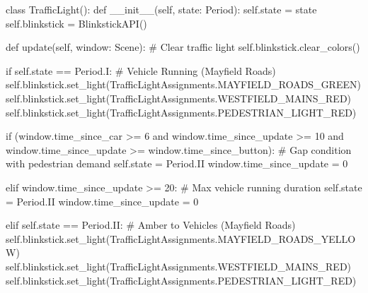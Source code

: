 \documentclass[
  letterpaper,
  DIV=11,
  numbers=noendperiod]{scrartcl}
\newenvironment{Shaded}{\begin{snugshade}}{\end{snugshade}}
\newcommand{\CommentTok}[1]{\textcolor[rgb]{0.37,0.37,0.37}{#1}}
\newcommand{\ControlFlowTok}[1]{\textcolor[rgb]{0.00,0.23,0.31}{#1}}
\newcommand{\DecValTok}[1]{\textcolor[rgb]{0.68,0.00,0.00}{#1}}
\newcommand{\FunctionTok}[1]{\textcolor[rgb]{0.28,0.35,0.67}{#1}}
\newcommand{\KeywordTok}[1]{\textcolor[rgb]{0.00,0.23,0.31}{#1}}
\newcommand{\NormalTok}[1]{\textcolor[rgb]{0.00,0.23,0.31}{#1}}
\newcommand{\OperatorTok}[1]{\textcolor[rgb]{0.37,0.37,0.37}{#1}}
\newcommand{\VariableTok}[1]{\textcolor[rgb]{0.07,0.07,0.07}{#1}}
\begin{document}
\begin{Shaded}
\begin{Highlighting}[]
\KeywordTok{class}\NormalTok{ TrafficLight():}
    \KeywordTok{def} \FunctionTok{\_\_init\_\_}\NormalTok{(}\VariableTok{self}\NormalTok{, state: Period):}
        \VariableTok{self}\NormalTok{.state }\OperatorTok{=}\NormalTok{ state}
        \VariableTok{self}\NormalTok{.blinkstick }\OperatorTok{=}\NormalTok{ BlinkstickAPI()}

    \KeywordTok{def}\NormalTok{ update(}\VariableTok{self}\NormalTok{, window: Scene):}
        \CommentTok{\# Clear traffic light}
        \VariableTok{self}\NormalTok{.blinkstick.clear\_colors()}

        \ControlFlowTok{if} \VariableTok{self}\NormalTok{.state }\OperatorTok{==}\NormalTok{ Period.I:}
            \CommentTok{\# Vehicle Running (Mayfield Roads)}
            \VariableTok{self}\NormalTok{.blinkstick.set\_light(TrafficLightAssignments.MAYFIELD\_ROADS\_GREEN)}
            \VariableTok{self}\NormalTok{.blinkstick.set\_light(TrafficLightAssignments.WESTFIELD\_MAINS\_RED)}
            \VariableTok{self}\NormalTok{.blinkstick.set\_light(TrafficLightAssignments.PEDESTRIAN\_LIGHT\_RED)}
            
            \ControlFlowTok{if}\NormalTok{ (window.time\_since\_car }\OperatorTok{\textgreater{}=} \DecValTok{6} \KeywordTok{and} 
\NormalTok{                window.time\_since\_update }\OperatorTok{\textgreater{}=} \DecValTok{10} \KeywordTok{and} 
\NormalTok{                window.time\_since\_update }\OperatorTok{\textgreater{}=}\NormalTok{ window.time\_since\_button):}
                \CommentTok{\# Gap condition with pedestrian demand}
                \VariableTok{self}\NormalTok{.state }\OperatorTok{=}\NormalTok{ Period.II}
\NormalTok{                window.time\_since\_update }\OperatorTok{=} \DecValTok{0}

            \ControlFlowTok{elif}\NormalTok{ window.time\_since\_update }\OperatorTok{\textgreater{}=} \DecValTok{20}\NormalTok{:}
                \CommentTok{\# Max vehicle running duration}
                \VariableTok{self}\NormalTok{.state }\OperatorTok{=}\NormalTok{ Period.II}
\NormalTok{                window.time\_since\_update }\OperatorTok{=} \DecValTok{0}
        
        \ControlFlowTok{elif} \VariableTok{self}\NormalTok{.state }\OperatorTok{==}\NormalTok{ Period.II:}
            \CommentTok{\# Amber to Vehicles (Mayfield Roads)}
            \VariableTok{self}\NormalTok{.blinkstick.set\_light(TrafficLightAssignments.MAYFIELD\_ROADS\_YELLOW)}
            \VariableTok{self}\NormalTok{.blinkstick.set\_light(TrafficLightAssignments.WESTFIELD\_MAINS\_RED)}
            \VariableTok{self}\NormalTok{.blinkstick.set\_light(TrafficLightAssignments.PEDESTRIAN\_LIGHT\_RED)}
            

\end{Highlighting}
\end{Shaded}
\end{document}
